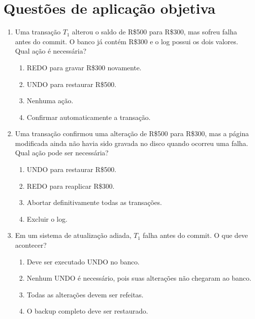 \documentclass[12pt,a4paper]{article}
\begin{document}
\section{Questões de aplicação objetiva}

\begin{enumerate}[resume,label=\textbf{Q\arabic*.}]

\item Uma transação $T_1$ alterou o saldo de R\$500 para R\$300, mas sofreu falha antes do commit. O banco já contém R\$300 e o log possui os dois valores. Qual ação é necessária?

\begin{enumerate}[label=\alph*)]
    \item REDO para gravar R\$300 novamente.
    \item UNDO para restaurar R\$500.
    \item Nenhuma ação.
    \item Confirmar automaticamente a transação.
\end{enumerate}

\item Uma transação confirmou uma alteração de R\$500 para R\$300, mas a página modificada ainda não havia sido gravada no disco quando ocorreu uma falha. Qual ação pode ser necessária?

\begin{enumerate}[label=\alph*)]
    \item UNDO para restaurar R\$500.
    \item REDO para reaplicar R\$300.
    \item Abortar definitivamente todas as transações.
    \item Excluir o log.
\end{enumerate}

\item Em um sistema de atualização adiada, $T_1$ falha antes do commit. O que deve acontecer?

\begin{enumerate}[label=\alph*)]
    \item Deve ser executado UNDO no banco.
    \item Nenhum UNDO é necessário, pois suas alterações não chegaram ao banco.
    \item Todas as alterações devem ser refeitas.
    \item O backup completo deve ser restaurado.
\end{enumerate}


\end{enumerate}
\end{document}
